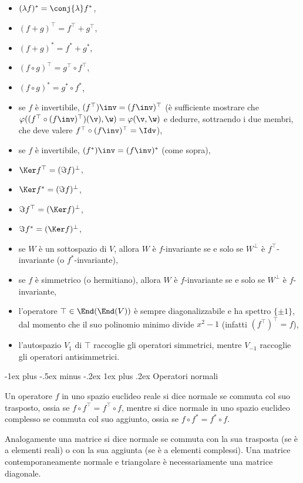 \documentclass[10pt,landscape]{article}
\makeatletter
\renewcommand{\subsubsection}{\@startsection{subsubsection}{3}{0mm}%
	{-1ex plus -.5ex minus -.2ex}%
	{1ex plus .2ex}%
	{\normalfont\small\bfseries}}
\makeatother
\begin{document}
\begin{multicols}{3}
\begin{itemize}
			\item $(\lambda f)^* = \conj{\lambda} f^*$,
			\item $(f + g)^\top = f^\top + g^\top$,
			\item $(f + g)^* = f^* + g^*$,
			\item $(f \circ g)^\top = g^\top \circ f^\top$,
			\item $(f \circ g)^* = g^* \circ f^*$,
			\item se $f$ è invertibile, $(f^\top)\inv = (f\inv)^\top$ (è sufficiente mostrare che $\varphi((f^\top \circ (f\inv)^\top)(\v), \w) = \varphi(\v, \w)$ e dedurre,
			sottraendo i due membri, che deve valere $f^\top \circ (f\inv)^\top = \Idv$),
			\item se $f$ è invertibile, $(f^*)\inv = (f\inv)^*$ (come sopra),
			\item $\Ker f^\top = (\Im f)^\perp$,
			\item $\Ker f^* = (\Im f)^\perp$,
			\item $\Im f^\top = (\Ker f)^\perp$,
			\item $\Im f^* = (\Ker f)^\perp$,
			\item se $W$ è un sottospazio di $V$, allora $W$ è $f$-invariante se e solo
			se $W^\perp$ è $f^\top$-invariante (o $f^*$-invariante),
			\item se $f$ è simmetrico (o hermitiano), allora $W$ è $f$-invariante se e solo se $W^\perp$ è $f$-invariante,
			\item l'operatore $\top \in \End(\End(V))$ è sempre diagonalizzabile
			e ha spettro $\{\pm 1\}$, dal momento che il suo polinomio minimo divide $x^2-1$ (infatti $(f^\top)^\top = f$),
			\item l'autospazio $V_1$ di $\top$ raccoglie gli operatori simmetrici, mentre
			$V_{-1}$ raccoglie gli operatori antisimmetrici.
		\end{itemize}

		\subsubsection{Operatori normali}
		
		Un operatore $f$ in uno spazio euclideo reale
		si dice normale se commuta col suo trasposto,
		ossia se $f \circ f^\top = f^\top \circ f$, mentre
		si dice normale in uno spazio euclideo complesso
		se commuta col suo aggiunto, ossia se $f \circ f^* = f^* \circ f$. \\ \vskip 0.05in
		
		Analogamente una matrice si dice
		normale se commuta con la sua trasposta (se è a elementi reali) o con la sua aggiunta (se è a elementi complessi). Una matrice contemporaneamente
		normale e triangolare è necessariamente una matrice
		diagonale. \\ \vskip 0.05in
		

\end{multicols}
\end{document}
